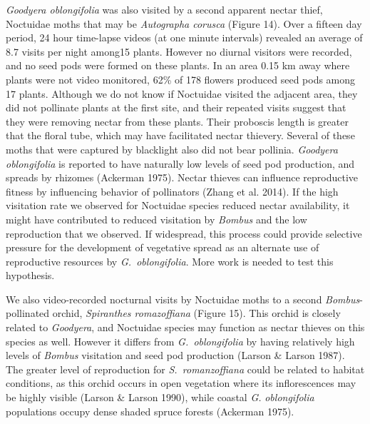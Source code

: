 \begin{multicols}{2}
\emph{Goodyera oblongifolia} was also visited by a second apparent
nectar thief, Noctuidae moths that may be \emph{Autographa corusca}
(Figure 14). Over a fifteen day period, 24 hour time-lapse videos (at
one minute intervals) revealed an average of 8.7 visits per night
among15 plants. However no diurnal visitors were recorded, and no seed
pods were formed on these plants. In an area 0.15 km away where plants
were not video monitored, 62\% of 178 flowers produced seed pods among
17 plants. Although we do not know if Noctuidae visited the adjacent
area, they did not pollinate plants at the first site, and their
repeated visits suggest that they were removing nectar from these
plants. Their proboscis length is greater that the floral tube, which
may have facilitated nectar thievery. Several of these moths that were
captured by blacklight also did not bear pollinia. \emph{Goodyera
oblongifolia} is reported to have naturally low levels of seed pod
production, and spreads by rhizomes (Ackerman 1975). Nectar thieves can
influence reproductive fitness by influencing behavior of pollinators
(Zhang et al. 2014). If the high visitation rate we observed for
Noctuidae species reduced nectar availability, it might have contributed
to reduced visitation by \emph{Bombus} and the low reproduction that we
observed. If widespread, this process could provide selective pressure
for the development of vegetative spread as an alternate use of
reproductive resources by \emph{G.\ oblongifolia}. More work is needed to
test this hypothesis.

We also video-recorded nocturnal visits by Noctuidae moths to a second
\emph{Bombus}-pollinated orchid, \emph{Spiranthes romazoffiana} (Figure
15). This orchid is closely related to \emph{Goodyera}, and Noctuidae
species may function as nectar thieves on this species as well. However
it differs from \emph{G.\ oblongifolia} by having relatively high levels
of \emph{Bombus} visitation and seed pod production (Larson \& Larson
1987). The greater level of reproduction for \emph{S.\ romanzoffiana} could be related to habitat conditions, as this
orchid occurs in open vegetation where its inflorescences may be highly
visible (Larson \& Larson 1990), while coastal \emph{G.}
\emph{oblongifolia} populations occupy dense shaded spruce forests
(Ackerman 1975).


\end{multicols}
